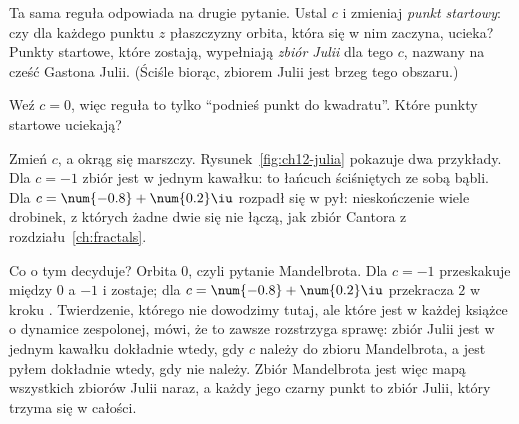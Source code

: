 \noindent
Ta sama reguła odpowiada na drugie pytanie. Ustal $c$ i zmieniaj
\emph{punkt startowy}: czy dla każdego punktu $z$ płaszczyzny orbita, która
się w nim zaczyna, ucieka? Punkty startowe, które zostają, wypełniają
\emph{zbiór Julii} dla tego $c$, nazwany na cześć Gastona Julii. (Ściśle
biorąc, zbiorem Julii jest brzeg tego obszaru.)


\begin{think}
Weź $c = 0$, więc reguła to tylko \enquote{podnieś punkt do kwadratu}. Które
punkty startowe uciekają?
\end{think}

\noindent
Zmień $c$, a okrąg się marszczy. Rysunek~\ref{fig:ch12-julia} pokazuje dwa
przykłady. Dla $c = -1$ zbiór jest w jednym kawałku: to łańcuch ściśniętych
ze sobą bąbli. Dla $c = \num{-0.8} + \num{0.2}\iu$ rozpadł się w pył:
nieskończenie wiele drobinek, z których żadne dwie się nie łączą, jak zbiór
Cantora z rozdziału~\ref{ch:fractals}.


\noindent
Co o tym decyduje? Orbita $0$, czyli pytanie Mandelbrota. Dla $c = -1$
przeskakuje między $0$ a $-1$ i zostaje; dla $c = \num{-0.8} +
\num{0.2}\iu$ przekracza $2$ w kroku . Twierdzenie,
którego nie dowodzimy tutaj, ale które jest w każdej książce o dynamice
zespolonej, mówi, że to zawsze rozstrzyga sprawę: zbiór Julii jest w
jednym kawałku dokładnie wtedy, gdy $c$ należy do zbioru Mandelbrota, a jest
pyłem dokładnie wtedy, gdy nie należy. Zbiór Mandelbrota jest więc mapą
wszystkich zbiorów Julii naraz, a każdy jego czarny punkt to zbiór Julii,
który trzyma się w całości.

